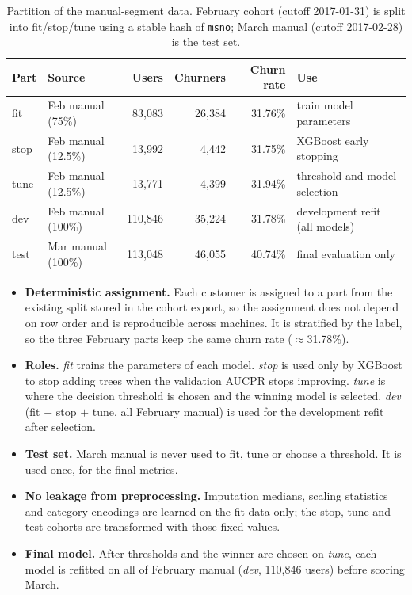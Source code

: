 \documentclass{article}
\begin{document}
\begin{table}[H]
\centering
\renewcommand{\arraystretch}{1.2}
\begin{tabular}{llrrrp{4.0cm}}
\toprule
\textbf{Part} & \textbf{Source} & \textbf{Users} & \textbf{Churners} & \textbf{Churn rate} & \textbf{Use} \\
\midrule
fit   & Feb manual (75\%)    & 83{,}083  & 26{,}384 & 31.76\% & train model parameters \\
stop  & Feb manual (12.5\%)  & 13{,}992  &  4{,}442 & 31.75\% & XGBoost early stopping \\
tune  & Feb manual (12.5\%)  & 13{,}771  &  4{,}399 & 31.94\% & threshold and model selection \\
\midrule
dev   & Feb manual (100\%)   & 110{,}846 & 35{,}224 & 31.78\% & development refit (all models) \\
\midrule
test  & Mar manual (100\%)   & 113{,}048 & 46{,}055 & 40.74\% & final evaluation only \\
\bottomrule
\end{tabular}
\caption{Partition of the manual-segment data. February cohort (cutoff 2017-01-31) is split into fit/stop/tune using a stable hash of \texttt{msno}; March manual (cutoff 2017-02-28) is the test set.}
\label{tab:w1_split}
\end{table}

\begin{itemize}
    \item \textbf{Deterministic assignment.} Each customer is assigned to a part from the existing split stored in the cohort export, so the assignment does not depend on row order and is reproducible across machines. It is stratified by the label, so the three February parts keep the same churn rate ($\approx$31.78\%).
    \item \textbf{Roles.} \emph{fit} trains the parameters of each model. \emph{stop} is used only by XGBoost to stop adding trees when the validation AUCPR stops improving. \emph{tune} is where the decision threshold is chosen and the winning model is selected. \emph{dev} (fit $+$ stop $+$ tune, all February manual) is used for the development refit after selection.
    \item \textbf{Test set.} March manual is never used to fit, tune or choose a threshold. It is used once, for the final metrics.
    \item \textbf{No leakage from preprocessing.} Imputation medians, scaling statistics and category encodings are learned on the fit data only; the stop, tune and test cohorts are transformed with those fixed values.
    \item \textbf{Final model.} After thresholds and the winner are chosen on \emph{tune}, each model is refitted on all of February manual (\emph{dev}, 110{,}846 users) before scoring March.
\end{itemize}
\end{document}

